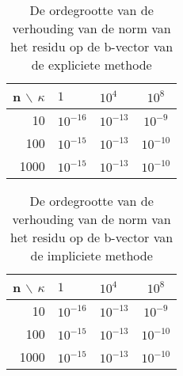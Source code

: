\begin{table}
\begin{center}
\begin{tabular}{r|llc}
n $\backslash$ $\kappa$ & $1$ & $10^4$ & $10^8$ \\\hline
10 & $10^{-16}$ & $10^{-13}$ & $10^{-9}$ \\
100 & $10^{-15}$ & $10^{-13}$ & $10^{-10}$ \\
1000 & $10^{-15}$ & $10^{-13}$ & $10^{-10}$
\end{tabular}
\end{center}
\caption{De ordegrootte van de verhouding van de norm van het residu op de b-vector van de expliciete methode}
\label{rb_exp}
\end{table}

\begin{table}
\begin{center}
\begin{tabular}{r|llc}
n $\backslash$ $\kappa$ & $1$ & $10^4$ & $10^8$ \\\hline
10 & $10^{-16}$ & $10^{-13}$ & $10^{-9}$ \\
100 & $10^{-15}$ & $10^{-13}$ & $10^{-10}$ \\
1000 & $10^{-15}$ & $10^{-13}$ & $10^{-10}$
\end{tabular}
\end{center}
\caption{De ordegrootte van de verhouding van de norm van het residu op de b-vector van de impliciete methode}
\label{rb_imp}
\end{table}